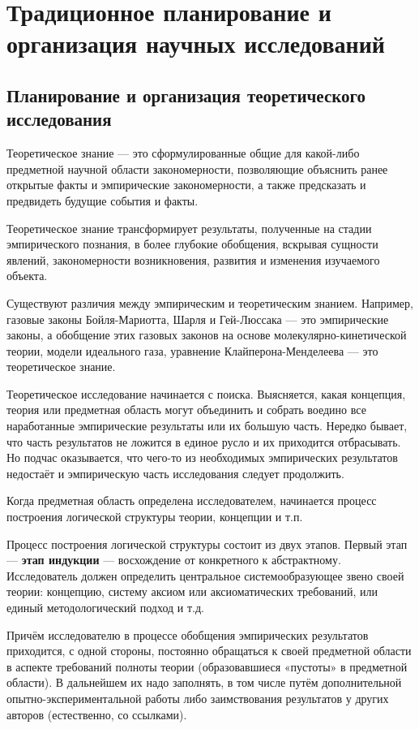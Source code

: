 \chapter{Традиционное планирование и организация научных исследований}

\section{Планирование и организация теоретического исследования}

Теоретическое знание --- это сформулированные общие для какой-либо предметной научной области закономерности, позволяющие объяснить ранее открытые факты и эмпирические закономерности, а также
предсказать и предвидеть будущие события и факты. \cite{lit6}

Теоретическое знание трансформирует результаты, полученные на
стадии эмпирического познания, в более глубокие обобщения, вскрывая
сущности явлений, закономерности возникновения, развития и изменения изучаемого объекта. \cite{lit6}

Существуют различия между эмпирическим и теоретическим знанием. Например, газовые законы Бойля-Мариотта, Шарля и Гей-Люссака --- это эмпирические законы, а обобщение этих газовых законов
на основе молекулярно-кинетической теории, модели идеального газа,
уравнение Клайперона-Менделеева --- это теоретическое знание. \cite{lit6}

Теоретическое исследование начинается с поиска. Выясняется, какая концепция, теория или предметная область могут объединить и собрать воедино все наработанные эмпирические результаты или их
большую часть. Нередко бывает, что часть результатов не ложится в
единое русло и их приходится отбрасывать. Но подчас оказывается, что
чего-то из необходимых эмпирических результатов недостаёт и эмпирическую часть исследования следует продолжить. \cite{lit6}

Когда предметная область определена исследователем, начинается
процесс построения логической структуры теории, концепции и т.п.  \cite{lit6}

Процесс построения логической структуры состоит из двух этапов.
Первый этап --- \textbf{этап индукции} --- восхождение от конкретного к абстрактному. Исследователь должен определить центральное системообразующее звено своей теории: концепцию, систему аксиом или аксиоматических требований, или единый методологический подход и т.д. \cite{lit6}

Причём исследователю в процессе обобщения эмпирических результатов приходится, с одной стороны, постоянно обращаться к своей предметной области в аспекте требований полноты теории (образовавшиеся
«пустоты» в предметной области). В дальнейшем их надо заполнять, в том
числе путём дополнительной опытно-экспериментальной работы либо заимствования результатов у других авторов (естественно, со ссылками). \cite{lit6}

